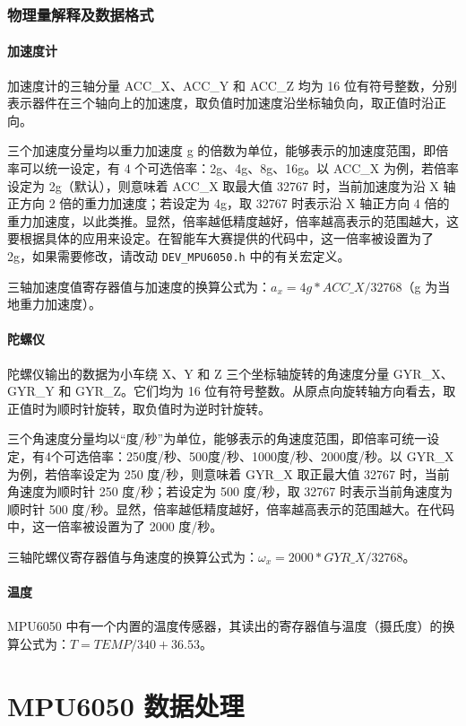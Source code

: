 \subsubsection{物理量解释及数据格式}
\paragraph{加速度计}
加速度计的三轴分量 ACC\_X、ACC\_Y 和 ACC\_Z 均为 16 位有符号整数，分别表示器件在三个轴向上的加速度，取负值时加速度沿坐标轴负向，取正值时沿正向。

三个加速度分量均以重力加速度 g 的倍数为单位，能够表示的加速度范围，即倍率可以统一设定，有 4 个可选倍率：2g、4g、8g、16g。以 ACC\_X 为例，若倍率设定为 2g（默认），则意味着 ACC\_X 取最大值 32767 时，当前加速度为沿 X 轴正方向 2 倍的重力加速度；若设定为 4g，取 32767 时表示沿 X 轴正方向 4 倍的重力加速度，以此类推。显然，倍率越低精度越好，倍率越高表示的范围越大，这要根据具体的应用来设定。在智能车大赛提供的代码中，这一倍率被设置为了 2g，如果需要修改，请改动 \lstinline{DEV_MPU6050.h} 中的有关宏定义。

三轴加速度值寄存器值与加速度的换算公式为：$a_x=4g*ACC\_X/32768$（g 为当地重力加速度）。

\paragraph{陀螺仪}
陀螺仪输出的数据为小车绕 X、Y 和 Z 三个坐标轴旋转的角速度分量 GYR\_X、GYR\_Y 和 GYR\_Z。它们均为 16 位有符号整数。从原点向旋转轴方向看去，取正值时为顺时针旋转，取负值时为逆时针旋转。

三个角速度分量均以“度/秒”为单位，能够表示的角速度范围，即倍率可统一设定，有4个可选倍率：250度/秒、500度/秒、1000度/秒、2000度/秒。以 GYR\_X 为例，若倍率设定为 250 度/秒，则意味着 GYR\_X 取正最大值 32767 时，当前角速度为顺时针 250 度/秒；若设定为 500 度/秒，取 32767 时表示当前角速度为顺时针 500 度/秒。显然，倍率越低精度越好，倍率越高表示的范围越大。在代码中，这一倍率被设置为了 2000 度/秒。

三轴陀螺仪寄存器值与角速度的换算公式为：$\omega_x=2000*GYR\_X/32768$。

\paragraph{温度}
MPU6050 中有一个内置的温度传感器，其读出的寄存器值与温度（摄氏度）的换算公式为：$T=TEMP/340+36.53$。

\section{MPU6050 数据处理}
